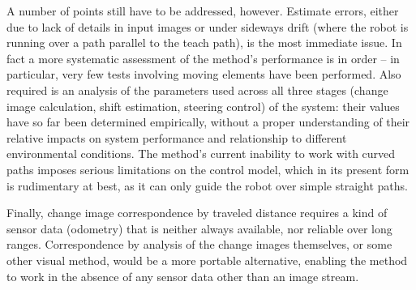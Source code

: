\documentclass[twocolumn, 9pt,fleqn]{jsproceedings}
\begin{document}
A number of points still have to be addressed, however. Estimate errors, either due to lack of details in input images or under sideways drift (where the robot is running over a path parallel to the teach path), is the most immediate issue. In fact a more systematic assessment of the method's performance is in order -- in particular, very few tests involving moving elements have been performed. Also required is an analysis of the parameters used across all three stages (change image calculation, shift estimation, steering control) of the system: their values have so far been determined empirically, without a proper understanding of their relative impacts on system performance and relationship to different environmental conditions. The method's current inability to work with curved paths imposes serious limitations on the control model, which in its present form is rudimentary at best, as it can only guide the robot over simple straight paths.

Finally, change image correspondence by traveled distance requires a kind of sensor data (odometry) that is neither always available, nor reliable over long ranges. Correspondence by analysis of the change images themselves, or some other visual method, would be a more portable alternative, enabling the method to work in the absence of any sensor data other than an image stream.

\vfill

\footnotesize




\normalsize
\end{document}
